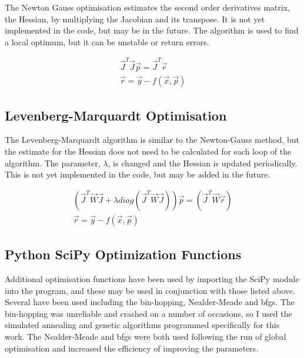 The Newton Gauss optimisation estimates the second order derivatives matrix, the Hessian, by multiplying the Jacobian and its transpose.  It is not yet implemented in the code, but may be in the future.  The algorithm is used to find a local optimum, but it can be unstable or return errors.

\begin{equation}
\begin{split}
\vec{J}^{T} \vec{J} \vec{p} = \vec{J}^{T} \vec{r} \\
\vec{r} = \vec{y} - f(\vec{x}, \vec{p})
\end{split}
\label{eq:eqNewtonGauss}
\end{equation}

\subsection{Levenberg-Marquardt Optimisation}

The Levenberg-Marquardt algorithm is similar to the Newton-Gauss method, but the estimate for the Hessian does not need to be calculated for each loop of the algorithm.  The parameter, $\lambda$, is changed and the Hessian is updated periodically.  This is not yet implemented in the code, but may be added in the future.

\begin{equation}
\begin{split}
\left( \vec{J}^{T} \vec{W} \vec{J} + \lambda diag\left( \vec{J}^{T} \vec{W} \vec{J} \right) \right) \vec{p} = {\left(\vec{J}^{T} \vec{W} \vec{r} \right)} \\
\vec{r} = \vec{y} - f(\vec{x}, \vec{p})
\end{split}
\label{eq:eqLevenbergMarquardt}
\end{equation}


\subsection{Python SciPy Optimization Functions}

Additional optimisation functions have been used by importing the SciPy module into the program, and these may be used in conjunction with those listed above.  Several have been used including the bin-hopping, Nealder-Meade and \acrshort{bfgs}.  The bin-hopping was unreliable and crashed on a number of occasions, so I used the simulated annealing and genetic algorithms programmed specifically for this work.  The Nealder-Meade and \acrshort{bfgs} were both used following the run of global optimisation and increased the efficiency of improving the parameters.








